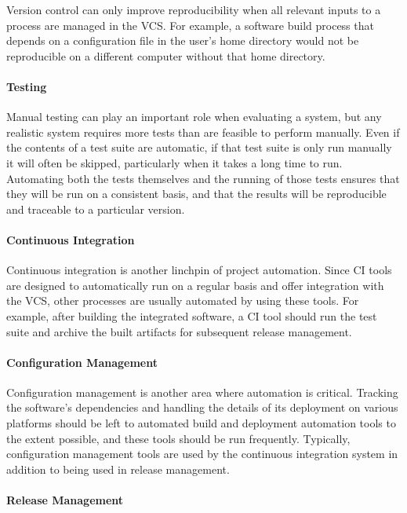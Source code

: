 Version control can only improve reproducibility when all relevant
inputs to a process are managed in the VCS. For example, a software
build process that depends on a configuration file in the user's home
directory would not be reproducible on a different computer without
that home directory.

\paragraph{Testing}

Manual testing can play an important role when evaluating a system,
but any realistic system requires more tests than are feasible to
perform manually. Even if the contents of a test suite are automatic,
if that test suite is only run manually it will often be skipped,
particularly when it takes a long time to run. Automating both the
tests themselves and the running of those tests ensures that they will
be run on a consistent basis, and that the results will be
reproducible and traceable to a particular version.

\paragraph{Continuous Integration}

Continuous integration is another linchpin of project
automation. Since CI tools are designed to automatically run on a
regular basis and offer integration with the VCS, other processes are
usually automated by using these tools. For example, after building
the integrated software, a CI tool should run the test suite and
archive the built artifacts for subsequent release management.

\paragraph{Configuration Management}

Configuration management is another area where automation is
critical. Tracking the software's dependencies and handling the
details of its deployment on various platforms should be left to
automated build and deployment automation tools to the extent
possible, and these tools should be run frequently. Typically,
configuration management tools are used by the continuous integration
system in addition to being used in release management.

\paragraph{Release Management}

